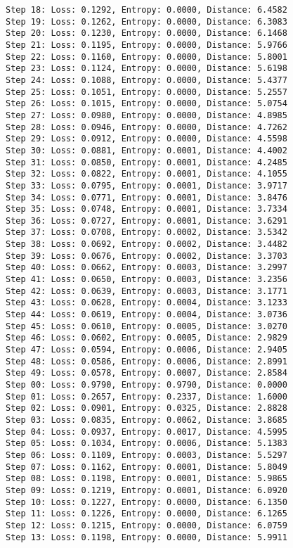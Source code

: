 \documentclass[11pt]{article}
\begin{document}
\begin{Verbatim}[commandchars=\\\{\}]
Step 18: Loss: 0.1292, Entropy: 0.0000, Distance: 6.4582
Step 19: Loss: 0.1262, Entropy: 0.0000, Distance: 6.3083
Step 20: Loss: 0.1230, Entropy: 0.0000, Distance: 6.1468
Step 21: Loss: 0.1195, Entropy: 0.0000, Distance: 5.9766
Step 22: Loss: 0.1160, Entropy: 0.0000, Distance: 5.8001
Step 23: Loss: 0.1124, Entropy: 0.0000, Distance: 5.6198
Step 24: Loss: 0.1088, Entropy: 0.0000, Distance: 5.4377
Step 25: Loss: 0.1051, Entropy: 0.0000, Distance: 5.2557
Step 26: Loss: 0.1015, Entropy: 0.0000, Distance: 5.0754
Step 27: Loss: 0.0980, Entropy: 0.0000, Distance: 4.8985
Step 28: Loss: 0.0946, Entropy: 0.0000, Distance: 4.7262
Step 29: Loss: 0.0912, Entropy: 0.0000, Distance: 4.5598
Step 30: Loss: 0.0881, Entropy: 0.0001, Distance: 4.4002
Step 31: Loss: 0.0850, Entropy: 0.0001, Distance: 4.2485
Step 32: Loss: 0.0822, Entropy: 0.0001, Distance: 4.1055
Step 33: Loss: 0.0795, Entropy: 0.0001, Distance: 3.9717
Step 34: Loss: 0.0771, Entropy: 0.0001, Distance: 3.8476
Step 35: Loss: 0.0748, Entropy: 0.0001, Distance: 3.7334
Step 36: Loss: 0.0727, Entropy: 0.0001, Distance: 3.6291
Step 37: Loss: 0.0708, Entropy: 0.0002, Distance: 3.5342
Step 38: Loss: 0.0692, Entropy: 0.0002, Distance: 3.4482
Step 39: Loss: 0.0676, Entropy: 0.0002, Distance: 3.3703
Step 40: Loss: 0.0662, Entropy: 0.0003, Distance: 3.2997
Step 41: Loss: 0.0650, Entropy: 0.0003, Distance: 3.2356
Step 42: Loss: 0.0639, Entropy: 0.0003, Distance: 3.1771
Step 43: Loss: 0.0628, Entropy: 0.0004, Distance: 3.1233
Step 44: Loss: 0.0619, Entropy: 0.0004, Distance: 3.0736
Step 45: Loss: 0.0610, Entropy: 0.0005, Distance: 3.0270
Step 46: Loss: 0.0602, Entropy: 0.0005, Distance: 2.9829
Step 47: Loss: 0.0594, Entropy: 0.0006, Distance: 2.9405
Step 48: Loss: 0.0586, Entropy: 0.0006, Distance: 2.8991
Step 49: Loss: 0.0578, Entropy: 0.0007, Distance: 2.8584
Step 00: Loss: 0.9790, Entropy: 0.9790, Distance: 0.0000
Step 01: Loss: 0.2657, Entropy: 0.2337, Distance: 1.6000
Step 02: Loss: 0.0901, Entropy: 0.0325, Distance: 2.8828
Step 03: Loss: 0.0835, Entropy: 0.0062, Distance: 3.8685
Step 04: Loss: 0.0937, Entropy: 0.0017, Distance: 4.5995
Step 05: Loss: 0.1034, Entropy: 0.0006, Distance: 5.1383
Step 06: Loss: 0.1109, Entropy: 0.0003, Distance: 5.5297
Step 07: Loss: 0.1162, Entropy: 0.0001, Distance: 5.8049
Step 08: Loss: 0.1198, Entropy: 0.0001, Distance: 5.9865
Step 09: Loss: 0.1219, Entropy: 0.0001, Distance: 6.0920
Step 10: Loss: 0.1227, Entropy: 0.0000, Distance: 6.1350
Step 11: Loss: 0.1226, Entropy: 0.0000, Distance: 6.1265
Step 12: Loss: 0.1215, Entropy: 0.0000, Distance: 6.0759
Step 13: Loss: 0.1198, Entropy: 0.0000, Distance: 5.9911

\end{Verbatim}
\end{document}
